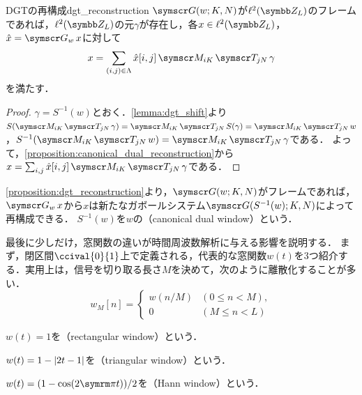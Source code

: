 \documentclass[../../main]{subfiles}
\begin{document}
\begin{proposition}{DGTの再構成}{dgt_reconstruction}
  \(\gaborsys{w}{K}{N}\)が\(\cycles{L}\)のフレームであれば，\(\cycles{L}\)の元\(\gamma\)が存在し，各\(x\in\cycles{L}\)，\(\hat{x}=\dgt{w}x\)に対して
  \[
    x = \sum_{(i,j)\in\Lambda}\hat{x}[i,j]\modulate{iK}\translate{jN}\gamma
  \]
  を満たす．
\end{proposition}

\begin{proof}
  \(\gamma=S^{-1}(w)\)とおく．\cref{lemma:dgt_shift}より\(S(\modulate{iK}\translate{jN}\gamma)=\modulate{iK}\translate{jN}S(\gamma)=\modulate{iK}\translate{jN}w\)，\(S^{-1}(\modulate{iK}\translate{jN}w)=\modulate{iK}\translate{jN}\gamma\)である．
  よって，\cref{proposition:canonical_dual_reconstruction}から\(x=\sum_{i,j}\hat{x}[i,j]\modulate{iK}\translate{jN}\gamma\)である．
\end{proof}

\cref{proposition:dgt_reconstruction}より，\(\gaborsys{w}{K}{N}\)がフレームであれば，\(\dgt{w}x\)から\(x\)は新たなガボールシステム\(\gaborsys{S^{-1}(w)}{K}{N}\)によって再構成できる．
\(S^{-1}(w)\)を\(w\)の（canonical dual window）という．

最後に少しだけ，窓関数の違いが時間周波数解析に与える影響を説明する．
まず，閉区間\(\ccival{0}{1}\)上で定義される，代表的な窓関数\(w(t)\)を3つ紹介する．実用上は，信号を切り取る長さ\(M\)を決めて，次のように離散化することが多い．
\[
  w_M[n] = \begin{cases}w(n/M) & (0\leq n<M), \\ 0 & (M\leq n<L)\end{cases}
\]

\begin{example}
  \(w(t)=1\)を（rectangular window）という．  
\end{example}

\begin{example}
  \(w(t)=1-\lvert2t-1\rvert\)を（triangular window）という．
\end{example}

\begin{example}
  \(w(t)=(1-\cos(2\krez t))/2\)を（Hann window）という．
\end{example}
\end{document}
